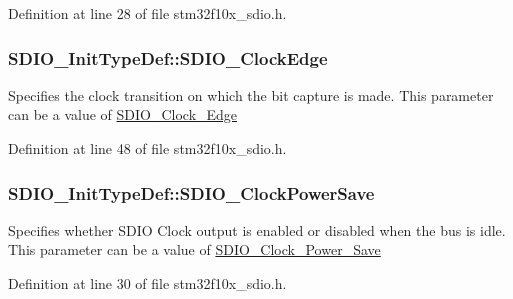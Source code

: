 Definition at line 28 of file stm32f10x\+\_\+sdio.\+h.

\subsubsection[{\texorpdfstring{S\+D\+I\+O\+\_\+\+Clock\+Edge}{SDIO_ClockEdge}}]{ S\+D\+I\+O\+\_\+\+Init\+Type\+Def\+::\+S\+D\+I\+O\+\_\+\+Clock\+Edge}\hypertarget{struct_s_d_i_o___init_type_def_a3252c846b68988b8ae70ca0d40030a52}{}\label{struct_s_d_i_o___init_type_def_a3252c846b68988b8ae70ca0d40030a52}
Specifies the clock transition on which the bit capture is made. This parameter can be a value of \hyperlink{group___s_d_i_o___clock___edge}{S\+D\+I\+O\+\_\+\+Clock\+\_\+\+Edge} 

Definition at line 48 of file stm32f10x\+\_\+sdio.\+h.

\subsubsection[{\texorpdfstring{S\+D\+I\+O\+\_\+\+Clock\+Power\+Save}{SDIO_ClockPowerSave}}]{ S\+D\+I\+O\+\_\+\+Init\+Type\+Def\+::\+S\+D\+I\+O\+\_\+\+Clock\+Power\+Save}\hypertarget{struct_s_d_i_o___init_type_def_a3cac4098adcb4e2d79f44e4b6de83d05}{}\label{struct_s_d_i_o___init_type_def_a3cac4098adcb4e2d79f44e4b6de83d05}
Specifies whether S\+D\+IO Clock output is enabled or disabled when the bus is idle. This parameter can be a value of \hyperlink{group___s_d_i_o___clock___power___save}{S\+D\+I\+O\+\_\+\+Clock\+\_\+\+Power\+\_\+\+Save} 

Definition at line 30 of file stm32f10x\+\_\+sdio.\+h.

